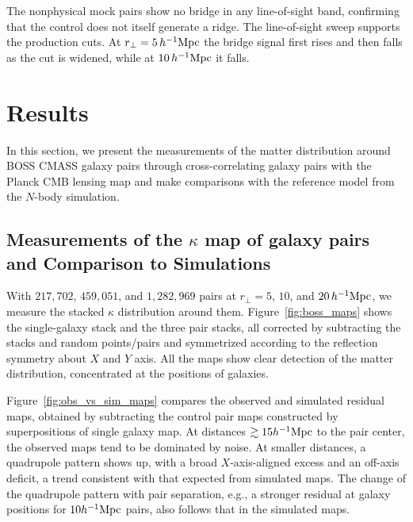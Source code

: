 \documentclass[preprint]{aastex701}
\newcommand{\hinvMpc}{h^{-1}{\rm Mpc}}
\begin{document}
The nonphysical mock pairs show no bridge in any line-of-sight band,
confirming that the control does not itself generate a ridge.
The line-of-sight sweep supports the production cuts. At
$r_{\perp}=5\,\hinvMpc$ the bridge signal first rises and then falls as the
cut is widened, while at $10\,\hinvMpc$ it falls.

\section{Results}
\label{sec:results}

In this section, we present the measurements of the matter distribution around BOSS CMASS galaxy pairs through cross-correlating galaxy pairs with the Planck CMB lensing map and make comparisons with the reference model from the $N$-body simulation. 

\subsection{Measurements of the $\kappa$ map of galaxy pairs and Comparison to Simulations}
\label{sec:obs_stacks}

With $217{,}702$, $459{,}051$, and $1{,}282{,}969$ pairs at $r_{\perp}=5$, $10$, and $20\,\hinvMpc$, we measure the stacked $\kappa$ distribution around them. Figure~\ref{fig:boss_maps} shows the single-galaxy stack and the
three pair stacks, all corrected by subtracting the stacks and random points/pairs and symmetrized according to the reflection symmetry about $X$ and $Y$ axis. All the maps show clear detection of the matter distribution, concentrated at the positions of galaxies.

Figure~\ref{fig:obs_vs_sim_maps} compares the
observed and simulated residual maps, obtained by subtracting the control pair maps constructed by superpositions of single galaxy map. 
At distances $\gtrsim 15\hinvMpc$ to the pair center, the observed maps tend to be dominated by noise. At smaller distances, a quadrupole pattern shows up, with a broad $X$-axis-aligned excess and an off-axis deficit, a trend consistent with that expected from simulated maps. The change of the quadrupole pattern with pair separation, e.g., a stronger residual at galaxy positions for $10\hinvMpc$ pairs, also follows that in the simulated maps.
\end{document}
